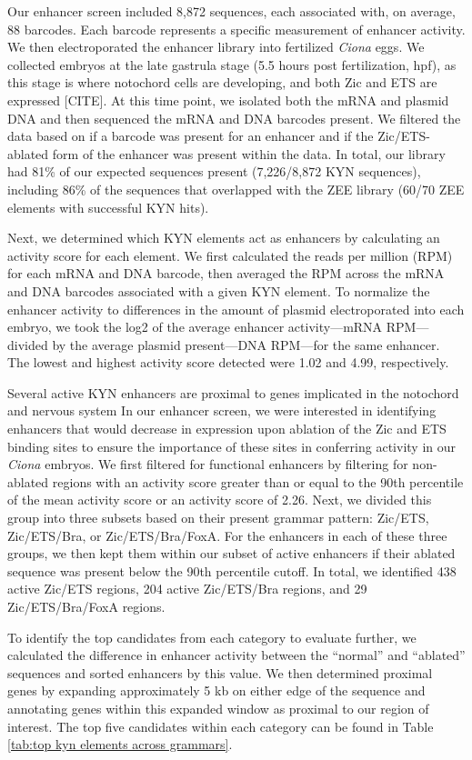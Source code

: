 Our enhancer screen included 8,872 sequences, each associated with, on average, 88 barcodes. Each barcode represents a specific measurement of enhancer activity. We then electroporated the enhancer library into fertilized \textit{Ciona} eggs. We collected embryos at the late gastrula stage (5.5 hours post fertilization, hpf), as this stage is where notochord cells are developing, and both Zic and ETS are expressed [CITE]. At this time point, we isolated both the mRNA and plasmid DNA and then sequenced the mRNA and DNA barcodes present. We filtered the data based on if a barcode was present for an enhancer and if the Zic/ETS-ablated form of the enhancer was present within the data. In total, our library had 81\% of our expected sequences present (7,226/8,872 KYN sequences), including 86\% of the sequences that overlapped with the ZEE library (60/70 ZEE elements with successful KYN hits).

Next, we determined which KYN elements act as enhancers by calculating an activity score for each element. We first calculated the reads per million (RPM) for each mRNA and DNA barcode, then averaged the RPM across the mRNA and DNA barcodes associated with a given KYN element. To normalize the enhancer activity to differences in the amount of plasmid electroporated into each embryo, we took the log2 of the average enhancer activity—mRNA RPM—divided by the average plasmid present—DNA RPM—for the same enhancer. The lowest and highest activity score detected were 1.02 and 4.99, respectively.

Several active KYN enhancers are proximal to genes implicated in the notochord and nervous system
In our enhancer screen, we were interested in identifying enhancers that would decrease in expression upon ablation of the Zic and ETS binding sites to ensure the importance of these sites in conferring activity in our \textit{Ciona} embryos. We first filtered for functional enhancers by filtering for non-ablated regions with an activity score greater than or equal to the 90th percentile of the mean activity score or an activity score of 2.26. Next, we divided this group into three subsets based on their present grammar pattern: Zic/ETS, Zic/ETS/Bra, or Zic/ETS/Bra/FoxA. For the enhancers in each of these three groups, we then kept them within our subset of active enhancers if their ablated sequence was present below the 90th percentile cutoff. In total, we identified 438 active Zic/ETS regions, 204 active Zic/ETS/Bra regions, and 29 Zic/ETS/Bra/FoxA regions. 

To identify the top candidates from each category to evaluate further, we calculated the difference in enhancer activity between the “normal” and “ablated” sequences and sorted enhancers by this value. We then determined proximal genes by expanding approximately 5 kb on either edge of the sequence and annotating genes within this expanded window as proximal to our region of interest. The top five candidates within each category can be found in Table \ref{tab:top kyn elements across grammars}.

